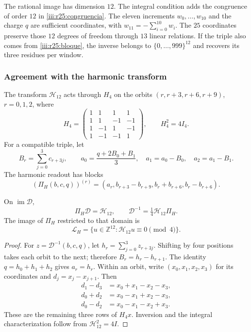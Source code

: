 The rational image has dimension $12$. The integral condition adds
the congruence of order $12$ in \eqref{iii:r25:congruencia}.
The eleven increments $w_0,\ldots,w_{10}$ and the charge $q$ are
sufficient coordinates, with $w_{11}=-\sum_{i=0}^{10}w_i$.
The $25$ coordinates preserve those $12$ degrees of freedom
through $13$ linear relations. If the triple also comes from
\eqref{iii:r25:bloque}, the inverse belongs to
$\{0,\ldots,999\}^{12}$ and recovers its three residues per window.

\subsubsection{Agreement with the harmonic transform}

The transform $\mathcal H_{12}$ acts through $H_4$ on the
orbits $(r,r+3,r+6,r+9)$, $r=0,1,2$, where
\[
 H_4=\begin{pmatrix}
 1&1&1&1\\1&1&-1&-1\\1&-1&1&-1\\1&-1&-1&1
 \end{pmatrix},\qquad H_4^2=4I_4.
\]
For a compatible triple, let
\[
 B_r=\sum_{j=0}^3c_{r+3j},\qquad
 a_0=\frac{q+2B_0+B_1}{3},\quad
 a_1=a_0-B_0,\quad a_2=a_1-B_1.
\]
The harmonic readout has blocks
\[
 (\Pi_H(b,c,q))^{(r)}
 =(a_r,b_{r+3}-b_{r+9},b_r+b_{r+6},b_r-b_{r+6}).
\]

\begin{proposition}
\label{iii:r25:hadamard}
On $\operatorname{im}\mathcal D$,
\[
 \Pi_H\mathcal D=\mathcal H_{12},\qquad
 \mathcal D^{-1}=\tfrac14\mathcal H_{12}\Pi_H.
\]
The image of $\Pi_H$ restricted to that domain is
\[
 \mathcal L_H=
 \{u\in\mathbb Z^{12}:\mathcal H_{12}u\equiv0\pmod4\}.
\]
\end{proposition}
\begin{proof}
For $z=\mathcal D^{-1}(b,c,q)$, let
$h_r=\sum_{j=0}^3z_{r+3j}$. Shifting by four positions
takes each orbit to the next; therefore $B_r=h_r-h_{r+1}$.
The identity $q=h_0+h_1+h_2$ gives $a_r=h_r$.
Within an orbit, write $(x_0,x_1,x_2,x_3)$ for its coordinates
and $d_j=x_j-x_{j+1}$. Then
\[
 \begin{aligned}
 d_1-d_3&=x_0+x_1-x_2-x_3,\\
 d_0+d_2&=x_0-x_1+x_2-x_3,\\
 d_0-d_2&=x_0-x_1-x_2+x_3.
 \end{aligned}
\]
These are the remaining three rows of $H_4x$. Inversion and the
integral characterization follow from $\mathcal H_{12}^2=4I$.
\end{proof}

